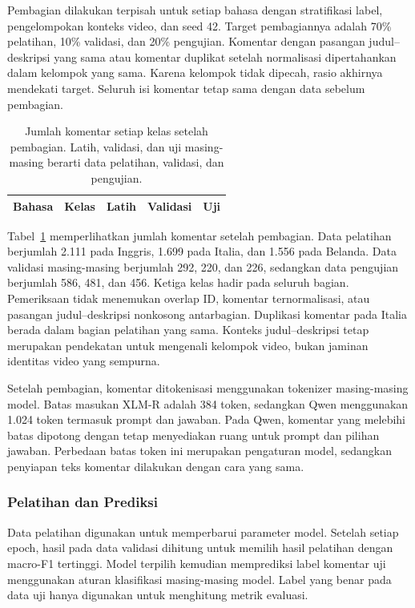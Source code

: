 \documentclass[11pt]{article}
\begin{document}
Pembagian dilakukan terpisah untuk setiap bahasa dengan stratifikasi label, pengelompokan konteks video, dan seed 42. Target pembagiannya adalah 70\% pelatihan, 10\% validasi, dan 20\% pengujian. Komentar dengan pasangan judul--deskripsi yang sama atau komentar duplikat setelah normalisasi dipertahankan dalam kelompok yang sama. Karena kelompok tidak dipecah, rasio akhirnya mendekati target. Seluruh isi komentar tetap sama dengan data sebelum pembagian.

\begin{table}[t]
\centering
\small
\setlength{\tabcolsep}{3pt}
\begin{tabular}{llrrr}
\toprule
Bahasa & Kelas & Latih & Validasi & Uji \\
\midrule

\end{tabular}
\caption{Jumlah komentar setiap kelas setelah pembagian. Latih, validasi, dan uji masing-masing berarti data pelatihan, validasi, dan pengujian.}
\label{tab:split}
\end{table}

Tabel~\ref{tab:split} memperlihatkan jumlah komentar setelah pembagian. Data pelatihan berjumlah 2.111 pada Inggris, 1.699 pada Italia, dan 1.556 pada Belanda. Data validasi masing-masing berjumlah 292, 220, dan 226, sedangkan data pengujian berjumlah 586, 481, dan 456. Ketiga kelas hadir pada seluruh bagian. Pemeriksaan tidak menemukan overlap ID, komentar ternormalisasi, atau pasangan judul--deskripsi nonkosong antarbagian. Duplikasi komentar pada Italia berada dalam bagian pelatihan yang sama. Konteks judul--deskripsi tetap merupakan pendekatan untuk mengenali kelompok video, bukan jaminan identitas video yang sempurna.

Setelah pembagian, komentar ditokenisasi menggunakan tokenizer masing-masing model. Batas masukan XLM-R adalah 384 token, sedangkan Qwen menggunakan 1.024 token termasuk prompt dan jawaban. Pada Qwen, komentar yang melebihi batas dipotong dengan tetap menyediakan ruang untuk prompt dan pilihan jawaban. Perbedaan batas token ini merupakan pengaturan model, sedangkan penyiapan teks komentar dilakukan dengan cara yang sama.

\subsubsection{Pelatihan dan Prediksi}
Data pelatihan digunakan untuk memperbarui parameter model. Setelah setiap epoch, hasil pada data validasi dihitung untuk memilih hasil pelatihan dengan macro-F1 tertinggi. Model terpilih kemudian memprediksi label komentar uji menggunakan aturan klasifikasi masing-masing model. Label yang benar pada data uji hanya digunakan untuk menghitung metrik evaluasi.
\end{document}
